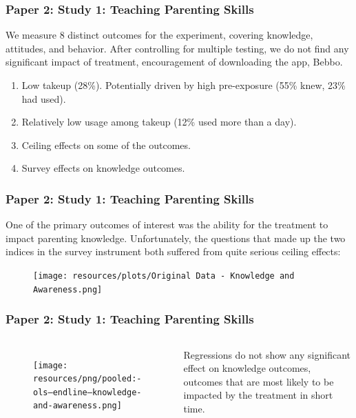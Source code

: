 \documentclass[aspectratio=169]{beamer}
\begin{document}
\begin{frame}
\frametitle{Paper 2: Study 1: Teaching Parenting Skills} 

We measure 8 distinct outcomes for the experiment, covering knowledge, attitudes, and behavior. After controlling for multiple testing, we do not find any significant impact of treatment, encouragement of downloading the app, Bebbo.

\begin{enumerate}
\item Low takeup (28\%). Potentially driven by high pre-exposure (55\% knew, 23\% had used). 
\item Relatively low usage among takeup (12\% used more than a day). 
\item Ceiling effects on some of the outcomes.
\item Survey effects on knowledge outcomes. 
\end{enumerate}

\end{frame}


\begin{frame}
\frametitle{Paper 2: Study 1: Teaching Parenting Skills} 

One of the primary outcomes of interest was the ability for the treatment to impact parenting knowledge. Unfortunately, the questions that made up the two indices in the survey instrument both suffered from quite serious ceiling effects: 
\begin{figure}[H]
\texttt{[image: resources/plots/Original Data - Knowledge and Awareness.png]}  
\end{figure}   

\end{frame}

\begin{frame}
\frametitle{Paper 2: Study 1: Teaching Parenting Skills} 


\begin{columns}

\begin{figure}[H]
\texttt{[image: resources/png/pooled:-ols---endline---knowledge-and-awareness.png]}  
\end{figure} 

Regressions do not show any significant effect on knowledge outcomes, outcomes that are most likely to be impacted by the treatment in short time. 

\end{columns}

\end{frame}
\end{document}
